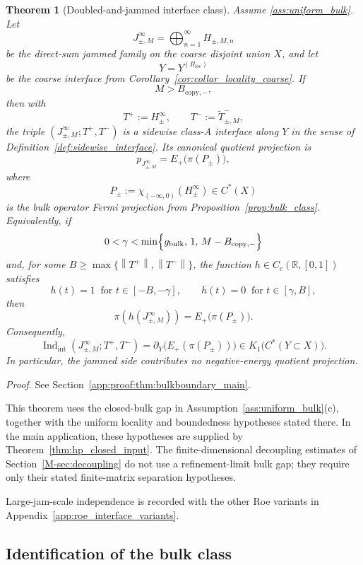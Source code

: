 \documentclass[11pt]{article}
\numberwithin{equation}{section}
\newtheorem{theorem}{Theorem}[section]
\theoremstyle{definition}
\theoremstyle{remark}
\newcommand{\proofref}[1]{%
  \par\noindent\emph{Proof.} See Section~\ref{#1}.\par\medskip
}
\newcommand{\proofappendixref}[1]{\proofref{#1}}
\newcommand{\opnorm}[1]{\left\lVert#1\right\rVert}
\newcommand{\Indint}{\operatorname{Ind}_{\mathrm{int}}}
\begin{document}
\begin{theorem}[Doubled-and-jammed interface class]\label{thm:bulkboundary_main}
Assume \ref{ass:uniform_bulk}. Let
\[
J_{\pm,M}^\infty=\bigoplus_{n=1}^\infty H_{\pm,M,n}
\]
be the direct-sum jammed family on the coarse disjoint union $X$, and let
\[
Y=Y^{(R_{\mathrm{loc}})}
\]
be the coarse interface from Corollary~\ref{cor:collar_locality_coarse}. If
\[
M>B_{\mathrm{copy},-},
\]
then with
\[
T^+:=H_\pm^\infty,
\qquad
T^-:=\widetilde T^-_{\pm,M},
\]
the triple $(J_{\pm,M}^\infty;T^+,T^-)$ is a sidewise class-A interface along $Y$ in the sense of
Definition~\ref{def:sidewise_interface}. Its canonical quotient projection is
\begin{equation}\label{eq:quotient_fermi_projection}
p_{J_{\pm,M}^\infty}=E_+\!\bigl(\pi(P_\pm)\bigr),
\end{equation}
where
\[
P_\pm:=\chi_{(-\infty,0)}(H_\pm^\infty)\in C^*(X)
\]
is the bulk operator Fermi projection from Proposition~\ref{prop:bulk_class}. Equivalently, if
\[
0<\gamma<\min\Bigl\{g_{\mathrm{bulk}},\,1,\,M-B_{\mathrm{copy},-}\Bigr\}
\]
and, for some $B\ge\max\{\opnorm{T^+},\opnorm{T^-}\}$, the function
$h\in C_c(\mathbb R,[0,1])$ satisfies
\[
h(t)=1\ \text{ for }t\in[-B,-\gamma],
\qquad
h(t)=0\ \text{ for }t\in[\gamma,B],
\]
then
\[
\pi(h(J_{\pm,M}^\infty))=E_+\!\bigl(\pi(P_\pm)\bigr).
\]
Consequently,
\begin{equation}\label{eq:main_interface_class}
\Indint(J_{\pm,M}^\infty;T^+,T^-)
=
\partial_Y\!\bigl(E_+(\pi(P_\pm))\bigr)
\in K_1\!\bigl(C^*(Y\subset X)\bigr).
\end{equation}
In particular, the jammed side contributes no negative-energy quotient projection.
\end{theorem}
\proofappendixref{app:proof:thm:bulkboundary_main}


This theorem uses the closed-bulk gap in Assumption~\ref{ass:uniform_bulk}(c), together with the
uniform locality and boundedness hypotheses stated there. In the main application,
these hypotheses are supplied by Theorem~\ref{thm:hp_closed_input}. The finite-dimensional
decoupling estimates of Section~\ref{M-sec:decoupling} do not use a refinement-limit bulk gap; they
require only their stated finite-matrix separation hypotheses.



Large-jam-scale independence is recorded with the other Roe variants in Appendix~\ref{app:roe_interface_variants}.

\subsection{Identification of the bulk class}
\end{document}
